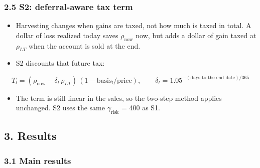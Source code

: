 \documentclass[
  11pt,
]{article}
\providecommand{\tightlist}{%
  \setlength{\itemsep}{0pt}\setlength{\parskip}{0pt}}
\begin{document}
\hypertarget{s2-deferral-aware-tax-term}{%
\subsubsection{2.5 S2: deferral-aware tax term}\label{s2-deferral-aware-tax-term}}

\begin{itemize}
\tightlist
\item
  Harvesting changes when gains are taxed, not how much is taxed in total. A dollar of loss realized today saves \(\rho_{\text{now}}\) now, but adds a dollar of gain taxed at \(\rho_{LT}\) when the account is sold at the end.
\item
  S2 discounts that future tax:
\end{itemize}

\[T_l = (\rho_{\text{now}} - \delta_t\,\rho_{LT})\,(1 - \text{basis}_l/\text{price}), \qquad \delta_t = 1.05^{-(\text{days to the end date})/365}\]

\begin{itemize}
\tightlist
\item
  The term is still linear in the sales, so the two-step method applies unchanged. S2 uses the same \(\gamma_{\text{risk}}\) = 400 as S1.
\end{itemize}

\hypertarget{results}{%
\subsection{3. Results}\label{results}}

\hypertarget{main-results}{%
\subsubsection{3.1 Main results}\label{main-results}}
\end{document}
